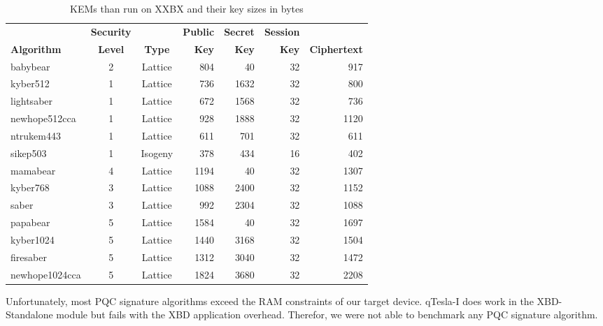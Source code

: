 \documentclass[10pt]{article}
\begin{document}
\begin{table}[ht]
  \centering
  \caption{KEMs than run on XXBX and their key sizes in bytes}\label{tab:sizeskem}
    \begin{tabular}{l|c|c|rrrr}
                   & \textbf{Security} &             & \textbf{Public} & \textbf{Secret} & \textbf{Session} & \\ 
\textbf{Algorithm} & \textbf{Level} & \textbf{Type} & \textbf{Key} & \textbf{Key} & \textbf{Key} & \textbf{Ciphertext} \\ \hline
babybear	& 2	         & Lattice &  804       &   40       & 32          &  917 \\
kyber512	& 1	         & Lattice &  736       & 1632       & 32          &  800 \\
lightsaber	& 1	         & Lattice &  672       & 1568       & 32          &  736 \\
newhope512cca	& 1	         & Lattice &  928       & 1888       & 32          & 1120 \\
ntrukem443	& 1	         & Lattice &  611       &  701       & 32          &  611 \\
sikep503	& 1	         & Isogeny &  378       &  434       & 16          &  402 \\
mamabear	& 4	         & Lattice & 1194       &   40       & 32          & 1307 \\
kyber768	& 3	         & Lattice & 1088       & 2400       & 32          & 1152 \\
saber    	& 3	         & Lattice &  992       & 2304       & 32          & 1088 \\
papabear	& 5	         & Lattice & 1584       &   40       & 32          & 1697 \\
kyber1024	& 5	         & Lattice & 1440       & 3168       & 32          & 1504 \\
firesaber	& 5	         & Lattice & 1312       & 3040       & 32          & 1472 \\
newhope1024cca	& 5	         & Lattice & 1824       & 3680       & 32          & 2208 \\
    \end{tabular}
\end{table}

Unfortunately, most PQC signature algorithms exceed the RAM constraints of our 
target device. qTesla-I does work in the 
XBD-Standalone module but fails with the XBD application overhead. Therefor, we
were not able to benchmark any PQC signature algorithm.
\end{document}
